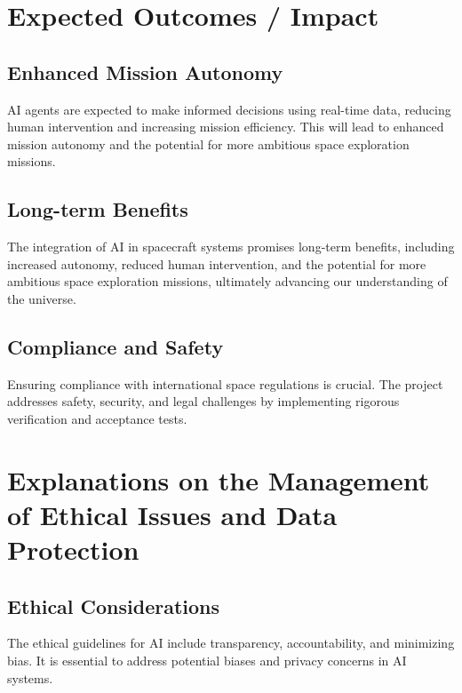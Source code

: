 \documentclass[a4paper,12pt]{article}
\begin{document}
\newpage

\section{Expected Outcomes / Impact}

\subsection{Enhanced Mission Autonomy}

AI agents are expected to make informed decisions using real-time data, reducing human intervention and increasing mission efficiency. This will lead to enhanced mission autonomy and the potential for more ambitious space exploration missions.

\subsection{Long-term Benefits}

The integration of AI in spacecraft systems promises long-term benefits, including increased autonomy, reduced human intervention, and the potential for more ambitious space exploration missions, ultimately advancing our understanding of the universe.

\subsection{Compliance and Safety}

Ensuring compliance with international space regulations is crucial. The project addresses safety, security, and legal challenges by implementing rigorous verification and acceptance tests.

\newpage

\section{Explanations on the Management of Ethical Issues and Data Protection}

\subsection{Ethical Considerations}

The ethical guidelines for AI include transparency, accountability, and minimizing bias. It is essential to address potential biases and privacy concerns in AI systems.
\end{document}
